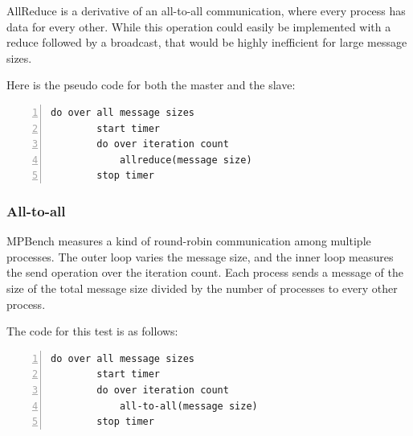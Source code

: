 AllReduce is a derivative of an all-to-all communication, where every
process has data for every other. While this operation could easily be
implemented with a reduce followed by a broadcast, that would be highly
inefficient for large message sizes. 

Here is the pseudo code for both the master and the slave:

\begin{minipage}{\textwidth}
\end{minipage}

\begin{minipage}{\textwidth}
\begin{lstlisting}[frame=single,numbers=left]
    do over all message sizes 
        start timer
        do over iteration count 
            allreduce(message size) 
        stop timer
\end{lstlisting}
\end{minipage}

\subsubsection{All-to-all}

MPBench measures a kind of round-robin communication among multiple
processes. The outer loop varies the message size, and the inner loop
measures the send operation over the iteration count. Each process sends a
message of the size of the total message size divided by the number of
processes to every other process.

The code for this test is as follows:

\begin{minipage}{\textwidth}
\end{minipage}

\begin{minipage}{\textwidth}
\begin{lstlisting}[frame=single,numbers=left]
    do over all message sizes 
        start timer
        do over iteration count 
            all-to-all(message size)
        stop timer
\end{lstlisting}
\end{minipage}

\clearpage
